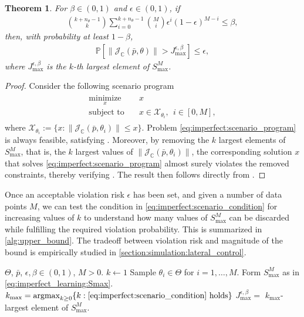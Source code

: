 \documentclass[journal,twoside,web,final]{ieeecolor}
\newtheorem{theorem}{Theorem}
\theoremstyle{definition}
\newcommand{\J}{\mathcal{J}}
\newcommand{\C}{\mathbb{C}}
\begin{document}
\begin{theorem}\label{thm:imperfect_learning}
For $\beta\in(0,1)$ and $\epsilon\in(0,1)$, if
\begin{align}
\binom{k+n_\theta-1}{k} \sum_{i=0}^{k+n_\theta-1} \binom{M}{i} \epsilon^i(1-\epsilon)^{M-i} \leq \beta, \label{eq:imperfect:scenario_condition}
\end{align}
then, with probability at least $1-\beta$,
\begin{align*}
\mathbb{P}[\| \J_\C(\bar{p},\theta) \| > J_\text{max}^{\epsilon,\beta}] \leq \epsilon,
\end{align*}
where $J_\text{max}^{\epsilon,\beta}$ is the $k$-th largest element of $S_{\text{max}}^M$.
\end{theorem}
\begin{proof}
Consider the following scenario program
\begin{align}
\begin{split}
\operatorname*{minimize}_{x} & \quad x\\
\text{subject to} & \quad x\in\mathcal{X}_{\theta_i}, ~~ i\in[0,M],
\end{split} \label{eq:imperfect:scenario_program}
\end{align}
where $\mathcal{X}_{\theta_i}:=\{ x: \|\J_\C(\bar{p},\theta_i)\| \leq x \}$.
Problem \cref{eq:imperfect:scenario_program} is always feasible,
satisfying \cite[Assumption 2.1]{campi2011sampling}.
Moreover, by removing the $k$ largest elements of $S_\text{max}^M$,
that is, the $k$ largest values of $\|\J_\C(\bar{p},\theta_i)\|$,
the corresponding solution $x$ that solves \cref{eq:imperfect:scenario_program} almost surely violates the removed constraints,
thereby verifying \cite[Assumption 2.2]{campi2011sampling}.
The result then follows directly from \cite[Theorem 2.1]{campi2011sampling}.
\end{proof}
%
Once an acceptable violation risk $\epsilon$ has been set, and given a number of data points $M$, we can test the condition in \cref{eq:imperfect:scenario_condition} for increasing values of $k$ to understand how many values of $S_\text{max}^M$ can be discarded while fulfilling the required violation probability.
This is summarized in \cref{alg:upper_bound}.
The tradeoff between violation risk and magnitude of the bound is empirically studied in \cref{section:simulation:lateral_control}.

\begin{algorithm}
\caption{Norm upper bound determination.} \label{alg:upper_bound}
\begin{algorithmic}[1]
\Require $\Theta$, $\bar{p}$, $\epsilon,\beta\in(0,1)$, $M>0$.
\Init $k\gets 1$
\State Sample $\theta_i\in \Theta$ for $i=1,\dots,M$.
\State Form $S_\text{max}^M$ as in \cref{eq:imperfect_learning:Smax}.
\State $k_\text{max}=\operatorname*{argmax}_{k \geq 0} \{ k: \text{\cref{eq:imperfect:scenario_condition} holds} \}$
\State \Return $J_\text{max}^{\epsilon,\beta} = $ $k_\text{max}$-largest element of $S_\text{max}^M$.
\end{algorithmic}
\end{algorithm}
\end{document}
